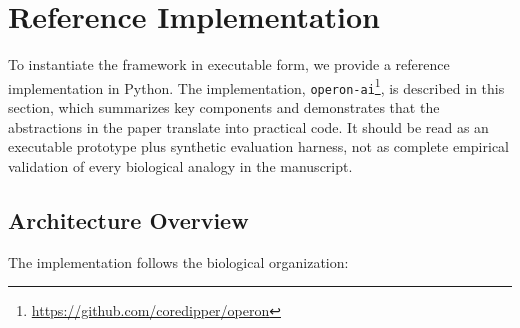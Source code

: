 \section{Reference Implementation}

To instantiate the framework in executable form, we provide a reference implementation in Python.
The implementation, \texttt{operon-ai}\footnote{\url{https://github.com/coredipper/operon}}, is described in this section,
which summarizes key components and demonstrates that the abstractions in the paper translate into practical code.
It should be read as an executable prototype plus synthetic evaluation harness, not as complete empirical
validation of every biological analogy in the manuscript.

\subsection{Architecture Overview}

The implementation follows the biological organization:


